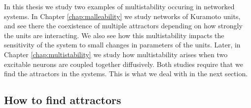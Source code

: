 In this thesis we study two examples of multistability occuring in networked systems. In Chapter \ref{chap:malleability} we study networks of Kuramoto units, and see there the coexistence of multiple attractors depending on how strongly the units are interacting. We also see how this multistability impacts the sensitivity of the system to small changes in parameters of the units. Later, in Chapter \ref{chap:multistability} we study how multistability arises when two excitable neurons are coupled together diffusively. Both studies require that we find the attractors in the systems. This is what we deal with in the next section.

\subsection{How to find attractors}


